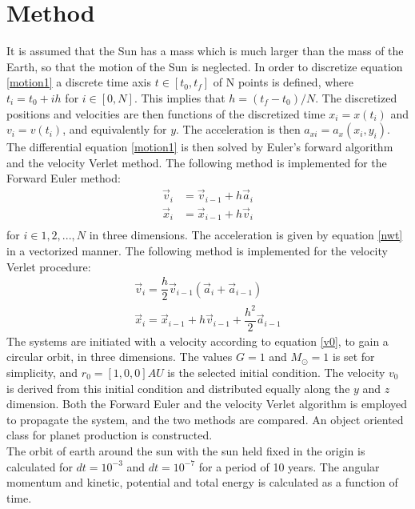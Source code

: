 \documentclass[%
reprint,nofootinbib,
amsmath,amssymb,
aps,
]{revtex4-1}
\begin{document}
\section{Method} \noindent 
It is assumed that the Sun has a mass which is much larger than the mass of the Earth, so that the motion of the Sun is neglected. In order to discretize equation \ref{motion1} a discrete time axis $t\in[t_0, t_{f}]$ of N points is defined, where $t_i = t_0 + ih$ for $i\in[0,N]$. This implies that $h = (t_f-t_0)/N$. The discretized positions and velocities are then functions of the discretized time $x_i = x(t_i)$ and $v_i = v(t_i)$, and equivalently for $y$. The acceleration is then $a_{xi} = a_x(x_i,y_i)$. \\
The differential equation \ref{motion1} is then solved by Euler's forward algorithm and the velocity Verlet method. The following method is implemented for the Forward Euler method:
\begin{align}
	\vec{v}_i & = \vec{v}_{i-1} + h\vec{a}_i \\ 
		\vec{x}_i & = \vec{x}_{i-1} + h\vec{v}_i \\ 
\end{align}
for $i \in {1, 2, ..., N}$ in three dimensions. The acceleration is given by equation \ref{nwt} in a vectorized manner. The following method is implemented for the velocity Verlet procedure:
\begin{align}
	\vec{v}_i = \dfrac{h}{2}\vec{v}_{i-1}(\vec{a}_i + \vec{a}_{i-1})\\ 
	\vec{x}_i = \vec{x}_{i-1} + h\vec{v}_{i-1} + \dfrac{h^2}{2}\vec{a}_{i-1}
\end{align}
The systems are initiated with a velocity according to equation \ref{v0}, to gain a circular orbit, in three dimensions. The values $G = 1$ and $M_\odot = 1$ is set for simplicity, and $r_0 = [1, 0, 0] AU$ is the selected initial condition. The velocity $v_0$ is derived from this initial condition and distributed equally along the $y$ and $z$ dimension. Both the Forward Euler and the velocity Verlet algorithm is employed to propagate the system, and the two methods are compared.
An object oriented class for planet production is constructed. \\
The orbit of earth around the sun with the sun held fixed in the origin is calculated for $dt = 10^{-3}$ and $dt = 10^{-7}$ for a period of 10 years. The angular momentum and kinetic, potential and total energy is calculated as a function of time.
\end{document}
